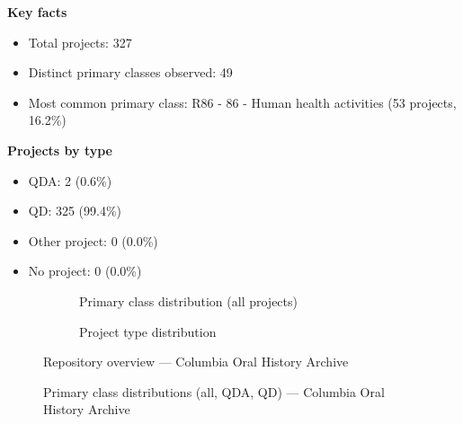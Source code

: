 \textbf{Key facts}

\begin{itemize}
    \item Total projects: 327
    \item Distinct primary classes observed: 49
    \item Most common primary class: R86 - 86 - Human health activities (53 projects, 16.2\%)
\end{itemize}

\textbf{Projects by type}

\begin{itemize}
    \item QDA: 2 (0.6\%)
    \item QD: 325 (99.4\%)
    \item Other project: 0 (0.0\%)
    \item No project: 0 (0.0\%)
\end{itemize}

\begin{figure}[H]
    \centering
    \begin{subfigure}[t]{0.49\textwidth}
        \centering
        
        \caption{Primary class distribution (all projects)}
    \end{subfigure}
    \hfill
    \begin{subfigure}[t]{0.49\textwidth}
        \centering
        
        \caption{Project type distribution}
    \end{subfigure}
    \caption{Repository overview --- Columbia Oral History Archive}
\end{figure}

\clearpage

\begin{figure}[H]
    \centering
    
    \par\vspace{0.8em}
    
    \par\vspace{0.8em}
    
    \caption{Primary class distributions (all, QDA, QD) --- Columbia Oral History Archive}
\end{figure}

